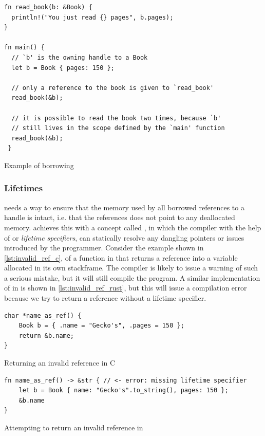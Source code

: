 \begin{listing}[tb]
\begin{verbatim}
fn read_book(b: &Book) {
  println!("You just read {} pages", b.pages);
}

fn main() {
  // `b' is the owning handle to a Book
  let b = Book { pages: 150 };

  // only a reference to the book is given to `read_book'
  read_book(&b);

  // it is possible to read the book two times, because `b'
  // still lives in the scope defined by the `main' function
  read_book(&b);
 }
\end{verbatim}
\caption{Example of borrowing}
\label{lst:borrowing_handle}
\end{listing}

\subsubsection{Lifetimes}
\label{ssec:lifetimes}

\rust needs a way to ensure that the memory used by all borrowed references to a handle is intact, i.e. that the references does not point to any deallocated memory.
\rust achieves this with a concept called , in which the compiler with the help of  or \emph{lifetime specifiers}, can statically resolve any dangling pointers or  issues introduced by the programmer.
Consider the example shown in \autoref{lst:invalid_ref_c}, of a function in \C that returns a reference into a variable allocated in its own stackframe.
The \C compiler is likely to issue a warning of such a serious mistake, but it will still compile the program.
A similar implementation of  in \rust is shown in \autoref{lst:invalid_ref_rust}, but this will issue a compilation error because we try to return a reference without a lifetime specifier.

\begin{listing}[tb]
\begin{verbatim}
char *name_as_ref() {
    Book b = { .name = "Gecko's", .pages = 150 };
    return &b.name;
}
\end{verbatim}
\caption{Returning an invalid reference in C}
\label{lst:invalid_ref_c}
\end{listing}

\begin{listing}[tb]
\begin{verbatim}
fn name_as_ref() -> &str { // <- error: missing lifetime specifier
    let b = Book { name: "Gecko's".to_string(), pages: 150 };
    &b.name
}
\end{verbatim}
\caption{Attempting to return an invalid reference in \rust}
\label{lst:invalid_ref_rust}
\end{listing}

